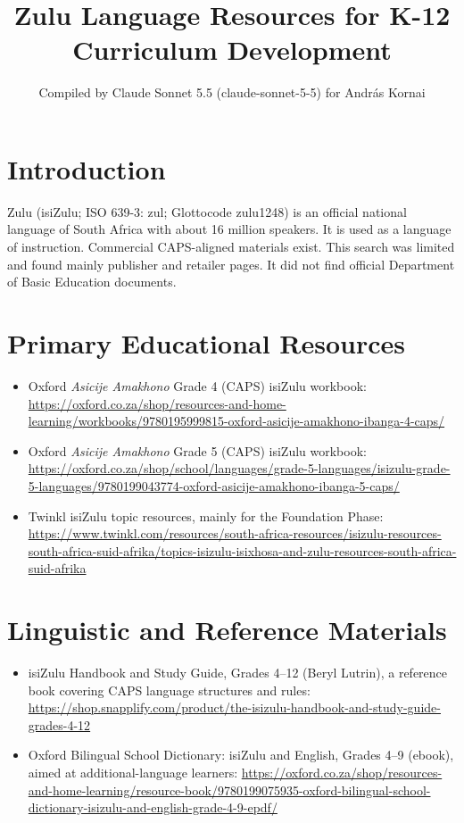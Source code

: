 \documentclass[12pt]{article}
\title{Zulu Language Resources for K-12 Curriculum Development}
\author{Compiled by Claude Sonnet 5.5 (claude-sonnet-5-5) for Andr\'as Kornai}
\date{}
\begin{document}
\maketitle

\section{Introduction}
Zulu (isiZulu; ISO 639-3: zul; Glottocode zulu1248) is an official national language of South Africa with about 16 million speakers. It is used as a language of instruction. Commercial CAPS-aligned materials exist. This search was limited and found mainly publisher and retailer pages. It did not find official Department of Basic Education documents.

\section{Primary Educational Resources}
\begin{itemize}
\item Oxford \textit{Asicije Amakhono} Grade 4 (CAPS) isiZulu workbook: \url{https://oxford.co.za/shop/resources-and-home-learning/workbooks/9780195999815-oxford-asicije-amakhono-ibanga-4-caps/}
\item Oxford \textit{Asicije Amakhono} Grade 5 (CAPS) isiZulu workbook: \url{https://oxford.co.za/shop/school/languages/grade-5-languages/isizulu-grade-5-languages/9780199043774-oxford-asicije-amakhono-ibanga-5-caps/}
\item Twinkl isiZulu topic resources, mainly for the Foundation Phase: \url{https://www.twinkl.com/resources/south-africa-resources/isizulu-resources-south-africa-suid-afrika/topics-isizulu-isixhosa-and-zulu-resources-south-africa-suid-afrika}
\end{itemize}

\section{Linguistic and Reference Materials}
\begin{itemize}
\item isiZulu Handbook and Study Guide, Grades 4--12 (Beryl Lutrin), a reference book covering CAPS language structures and rules: \url{https://shop.snapplify.com/product/the-isizulu-handbook-and-study-guide-grades-4-12}
\item Oxford Bilingual School Dictionary: isiZulu and English, Grades 4--9 (ebook), aimed at additional-language learners: \url{https://oxford.co.za/shop/resources-and-home-learning/resource-book/9780199075935-oxford-bilingual-school-dictionary-isizulu-and-english-grade-4-9-epdf/}
\end{itemize}
\end{document}
